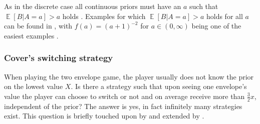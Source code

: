 \documentclass[twoside,a4paper]{article}
\theoremstyle{plain}
\theoremstyle{definition}
\theoremstyle{remark}
\numberwithin{equation}{section}
\DeclareMathOperator{\E}{\mathbb{E}}
\DeclareMathOperator{\1}{\mathbbm{1}}
\begin{document}
As in the discrete case all continuous priors must have an $a$ such that $\E[B|A=a]>a$ holds \cite{Brams95}. Examples for which $\E[B|A=a]>a$ holds for all $a$ can be found in \cite{Christensen96,Broome95,Brams95}, with $f(a)=(a+1)^{-2}$ for $a\in(0,\infty)$ being one of the easiest examples \cite{Broome95}.

\subsubsection{Cover's switching strategy}
When playing the two envelope game, the player usually does not know the prior on the lowest value $X$. Is there a strategy such that upon seeing one envelope's value the player can choose to switch or not and on average receive more than $\frac{3}{2}x$, independent of the prior? The answer is yes, in fact infinitely many strategies exist. This question is briefly touched upon by \cite{Christensen92,Christensen94} and extended by \cite{McDonnell09,Abbott10,McDonnell11}. 
\end{document}
